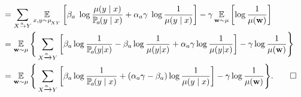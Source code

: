 \begin{subappendices}
\begin{lproof}
\begin{align*}
		&= \sum\alle 
			\Ex_{x,y \sim \mu_{\!_{XY}}}  \left[ \beta_a\; \log\frac{\mu(y\mid x)}{\p_a(y\mid x)} + \alpha_a\gamma \; \log \frac{1}{\mu(y\mid x)}  \right]  - \gamma  \Ex_{\mat w \sim \mu} \left[ \log \frac{1}{\mu(\mat w)}\right] \\
		&= \Ex_{\mat w \sim \mu} \Bigg\{   \sum_{ X \xrightarrow{\!\!a} Y  } \left[
			\beta_a \log \frac{1}{\p_a(y | x)}   - \beta_a  \log \frac{1}{\mu(y | x)}+ \alpha_a\gamma \log \frac{1}{\mu(y | x)} \right]
              -  \gamma  \log \frac{1}{\mu(\mat w)}\Bigg\}
            \\
		&=  \Ex_{\mat w \sim \mu} \Bigg\{ \sum_{ X \xrightarrow{\!\!a} Y  } \left[
			\beta_a \log \frac{1}{\p_a(y\mid x)} +
	                        (\alpha_a\gamma - \beta_a ) \log
	                        \frac{1}{\mu(y \mid x)} \right] -
	                        \gamma \log \frac{1}{\mu(\mat w)}  \Bigg\}.  
                \qedhere
	\end{align*}
\end{lproof}


\end{subappendices}
